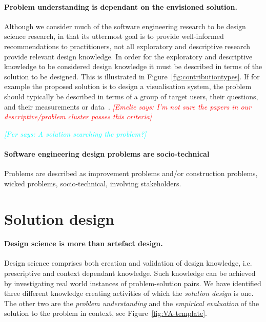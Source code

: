 \documentclass[graybox]{svmult}
\newcommand{\emelie}[1]{\textcolor{red}{{\it [Emelie says: #1]}}}
\newcommand{\per}[1]{\textcolor{cyan}{{\it [Per says: #1]}}}
\newcommand{\emelie}[1]{}
\newcommand{\per}[1]{}
\begin{document}
\paragraph{Problem understanding is dependant on the envisioned solution.}Although we consider much of the software engineering research to be design science research, in that its uttermost goal is to provide well-informed recommendations to practitioners, not all exploratory and descriptive research provide relevant design knowledge. In order for the exploratory and descriptive knowledge to be considered design knowledge it must be described in terms of the solution to be designed. This is illustrated in Figure~\ref{fig:contributiontypes}. If for example the proposed solution is to design a visualisation system, the problem should typically be described in terms of a group of target users, their questions, and their measurements or data~\cite{meyer_nested_2015}. \emelie{I'm not sure the papers in our descriptive/problem cluster passes this criteria}

\per{A solution searching the problem?}

\paragraph{Software engineering design problems are socio-technical}
Problems are described as improvement problems and/or construction problems, wicked problems, socio-technical, involving stakeholders. 



\section{Solution design}
\paragraph{Design science is more than artefact design.}

Design science comprises both creation and validation of design knowledge, i.e. prescriptive and context dependant knowledge. Such knowledge can be achieved by investigating real world instances of problem-solution pairs. We have identified three different knowledge creating activities of which the \emph{solution design} is one. The other two are the \emph{problem understanding} and the \emph{empirical evaluation} of the solution to the problem in context, see Figure~\ref{fig:VA-template}.
\end{document}
